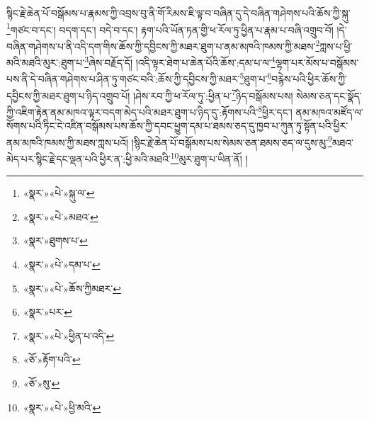 སྙིང་རྗེ་ཆེན་པོ་བསྒོམས་པ་རྣམས་ཀྱི་འབྲས་བུ་ནི་གོ་རིམས་ཇི་ལྟ་བ་བཞིན་དུ་དེ་བཞིན་གཤེགས་པའི་ཆོས་ཀྱི་སྐུ་\footnote{«སྣར་»«པེ་»སྐུ་ལ་}གཙང་བ་དང་། བདག་དང་། བདེ་བ་དང་། རྟག་པའི་ཡོན་ཏན་གྱི་ཕ་རོལ་ཏུ་ཕྱིན་པ་རྣམ་པ་བཞི་འགྲུབ་བོ། །དེ་བཞིན་གཤེགས་པ་ནི་འདི་དག་གིས་ཆོས་ཀྱི་དབྱིངས་ཀྱི་མཐར་ཐུག་པ་ནམ་མཁའི་ཁམས་ཀྱི་མཐས་\footnote{«སྣར་»«པེ་»མཐའ་}ཀླས་པ་ཕྱི་མའི་མཐའི་མུར་:ཐུག་པ་\footnote{«སྣར་»ཐུགས་པ་}ཞེས་བརྗོད་དོ། །འདི་ལྟར་ཐེག་པ་ཆེན་པོའི་ཆོས་:དམ་པ་ལ་\footnote{«སྣར་»«པེ་»དམ་པ་}ལྷག་པར་མོས་པ་བསྒོམས་པས་ནི་དེ་བཞིན་གཤེགས་པ་ཤིན་ཏུ་གཙང་བའི་:ཆོས་ཀྱི་དབྱིངས་ཀྱི་མཐར་\footnote{«སྣར་»«པེ་»ཆོས་ཀྱིམཐར་}ཐུག་པ་\footnote{«སྣར་»པར་}བརྙེས་པའི་ཕྱིར་ཆོས་ཀྱི་དབྱིངས་ཀྱི་མཐར་ཐུག་པ་ཉིད་འགྲུབ་པོ། །ཤེས་རབ་ཀྱི་ཕ་རོལ་ཏུ་:ཕྱིན་པ་\footnote{«སྣར་»«པེ་»ཕྱིན་པ་འདི་}ཉིད་བསྒོམས་པས། སེམས་ཅན་དང་སྣོད་ཀྱི་འཇིག་རྟེན་ནམ་མཁའ་ལྟར་བདག་མེད་པའི་མཐར་ཐུག་པ་ཉིད་དུ་:རྟོགས་པའི་\footnote{«ཅོ་»རྟོག་པའི་}ཕྱིར་དང་། ནམ་མཁའ་མཛོད་ལ་སོགས་པའི་ཏིང་ངེ་འཛིན་བསྒོམས་པས་ཆོས་ཀྱི་དབང་ཕྱུག་དམ་པ་ཐམས་ཅད་དུ་ཁྱབ་པ་ཀུན་ཏུ་སྟོན་པའི་ཕྱིར་ནམ་མཁའི་ཁམས་ཀྱི་མཐས་ཀླས་པའོ། །སྙིང་རྗེ་ཆེན་པོ་བསྒོམས་པས་སེམས་ཅན་ཐམས་ཅད་ལ་དུས་མུ་\footnote{«ཅོ་»སུ་}མཐའ་མེད་པར་སྙིང་རྗེ་དང་ལྡན་པའི་ཕྱིར་ན་:ཕྱི་མའི་མཐའི་\footnote{«སྣར་»«པེ་»ཕྱི་མའི་}མུར་ཐུག་པ་ཡིན་ནོ། །
